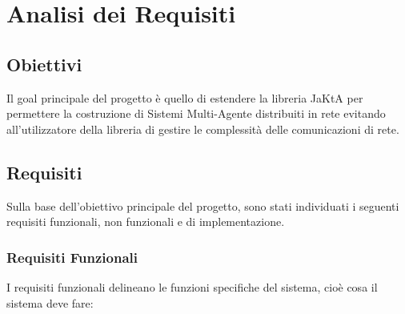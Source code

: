 \section{Analisi dei Requisiti}

%
%

%

\subsection{Obiettivi}

Il goal principale del progetto è quello di estendere la libreria JaKtA per permettere la costruzione di Sistemi Multi-Agente distribuiti in rete evitando all'utilizzatore della libreria di gestire le complessità delle comunicazioni di rete.

\subsection{Requisiti}
Sulla base dell'obiettivo principale del progetto, sono stati individuati i seguenti requisiti funzionali, non funzionali e di implementazione.

\subsubsection{Requisiti Funzionali}
I requisiti funzionali delineano le funzioni specifiche del sistema, cioè cosa il sistema deve fare:

